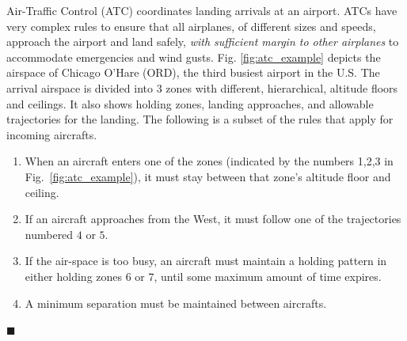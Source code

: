 \begin{exmp}
Air-Traffic Control (ATC) coordinates landing arrivals at an airport. 
ATCs have very complex rules to ensure that all airplanes, of different sizes and speeds, approach the airport and land safely, \textit{with sufficient margin to other airplanes} to accommodate emergencies and wind gusts.
Fig. \ref{fig:atc_example} depicts the airspace of Chicago O'Hare (ORD), the third busiest airport in the U.S.
The arrival airspace is divided into 3 zones with different, hierarchical, altitude floors and ceilings. 
It also shows holding zones, landing approaches, and allowable trajectories for the landing. 
The following is a subset of the rules that apply for incoming aircrafts.

\begin{enumerate}
\vspace{-5pt}
\item When an aircraft enters one of the zones (indicated by the numbers 1,2,3 in Fig.~\ref{fig:atc_example}), it must stay between that zone's altitude floor and ceiling.%
\label{rule:floor ceiling}
\vspace{-5pt}
\item If an aircraft approaches from the West, it must follow one of the trajectories numbered $4$ or $5$. 
\label{rule:waypoints}
\vspace{-5pt}
\item If the air-space is too busy, an aircraft must maintain a holding pattern in either holding zones $6$ or $7$, until some maximum amount of time expires.
\label{rule:holding}
\vspace{-5pt}
\item A minimum separation must be maintained between aircrafts.
\vspace{-5pt}
\end{enumerate}
\end{exmp}
\begin{flushright} $\blacksquare$ \end{flushright}